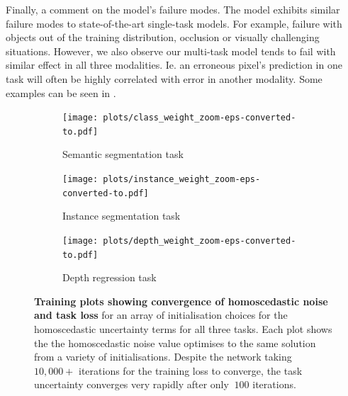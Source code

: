 Finally, a comment on the model's failure modes. The model exhibits similar failure modes to state-of-the-art single-task models. For example, failure with objects out of the training distribution, occlusion or visually challenging situations. However, we also observe our multi-task model tends to fail with similar effect in all three modalities. Ie. an erroneous pixel's prediction in one task will often be highly correlated with error in another modality. Some examples can be seen in .

\begin{figure}[t]
\begin{subfigure}[t]{0.32\linewidth}
\begin{center}
  \texttt{[image: plots/class\_weight\_zoom-eps-converted-to.pdf]}
  \caption{Semantic segmentation task}
\end{center}
\end{subfigure}
\begin{subfigure}[t]{0.32\linewidth}
\begin{center}
  \texttt{[image: plots/instance\_weight\_zoom-eps-converted-to.pdf]}
  \caption{Instance segmentation task}
\end{center}
\end{subfigure}
\begin{subfigure}[t]{0.32\linewidth}
\begin{center}
  \texttt{[image: plots/depth\_weight\_zoom-eps-converted-to.pdf]}
  \caption{Depth regression task}
\end{center}
\end{subfigure}
   \caption[Convergence of homoscedastic noise and task losses.]{\textbf{Training plots showing convergence of homoscedastic noise and task loss} for an array of initialisation choices for the homoscedastic uncertainty terms for all three tasks. Each plot shows the the homoscedastic noise value optimises to the same solution from a variety of initialisations. Despite the network taking $10,000+$ iterations for the training loss to converge, the task uncertainty converges very rapidly after only $~100$ iterations.}
\label{fig:convergence}
\end{figure}

